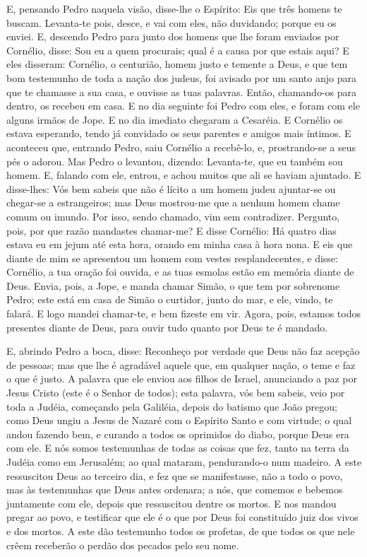 E, pensando Pedro naquela visão, disse-lhe o Espírito: Eis que
três homens te buscam. Levanta-te pois, desce, e vai com
eles, não duvidando; porque eu os enviei. E, descendo Pedro
para junto dos homens que lhe foram enviados por Cornélio, disse:
Sou eu a quem procurais; qual é a causa por que estais aqui?
E eles disseram: Cornélio, o centurião, homem justo e temente
a Deus, e que tem bom testemunho de toda a nação dos judeus, foi
avisado por um santo anjo para que te chamasse a sua casa, e ouvisse
as tuas palavras. Então, chamando-os para dentro, os recebeu
em casa. E no dia seguinte foi Pedro com eles, e foram com ele
alguns irmãos de Jope. E no dia imediato chegaram a Cesaréia.
E Cornélio os estava esperando, tendo já convidado os seus parentes
e amigos mais íntimos. E aconteceu que, entrando Pedro, saiu
Cornélio a recebê-lo, e, prostrando-se a seus pés o adorou.
Mas Pedro o levantou, dizendo: Levanta-te, que eu também sou
homem. E, falando com ele, entrou, e achou muitos que ali se
haviam ajuntado. E disse-lhes: Vós bem sabeis que não é
lícito a um homem judeu ajuntar-se ou chegar-se a estrangeiros; mas
Deus mostrou-me que a nenhum homem chame comum ou imundo. Por
isso, sendo chamado, vim sem contradizer. Pergunto, pois, por que
razão mandastes chamar-me? E disse Cornélio: Há quatro dias
estava eu em jejum até esta hora, orando em minha casa à hora nona.
E eis que diante de mim se apresentou um homem com vestes
resplandecentes, e disse: Cornélio, a tua oração foi ouvida, e as
tuas esmolas estão em memória diante de Deus. Envia, pois, a
Jope, e manda chamar Simão, o que tem por sobrenome Pedro; este está
em casa de Simão o curtidor, junto do mar, e ele, vindo, te falará.
E logo mandei chamar-te, e bem fizeste em vir. Agora, pois,
estamos todos presentes diante de Deus, para ouvir tudo quanto por
Deus te é mandado.

E, abrindo Pedro a boca, disse: Reconheço por verdade que Deus
não faz acepção de pessoas; mas que lhe é agradável aquele
que, em qualquer nação, o teme e faz o que é justo. A palavra
que ele enviou aos filhos de Israel, anunciando a paz por Jesus
Cristo (este é o Senhor de todos); esta palavra, vós bem
sabeis, veio por toda a Judéia, começando pela Galiléia, depois do
batismo que João pregou; como Deus ungiu a Jesus de Nazaré
com o Espírito Santo e com virtude; o qual andou fazendo bem, e
curando a todos os oprimidos do diabo, porque Deus era com ele.
E nós somos testemunhas de todas as coisas que fez, tanto na
terra da Judéia como em Jerusalém; ao qual mataram, pendurando-o num
madeiro. A este ressuscitou Deus ao terceiro dia, e fez que
se manifestasse, não a todo o povo, mas às testemunhas que
Deus antes ordenara; a nós, que comemos e bebemos juntamente com
ele, depois que ressuscitou dentre os mortos. E nos mandou
pregar ao povo, e testificar que ele é o que por Deus foi
constituído juiz dos vivos e dos mortos. A este dão
testemunho todos os profetas, de que todos os que nele crêem
receberão o perdão dos pecados pelo seu nome.

